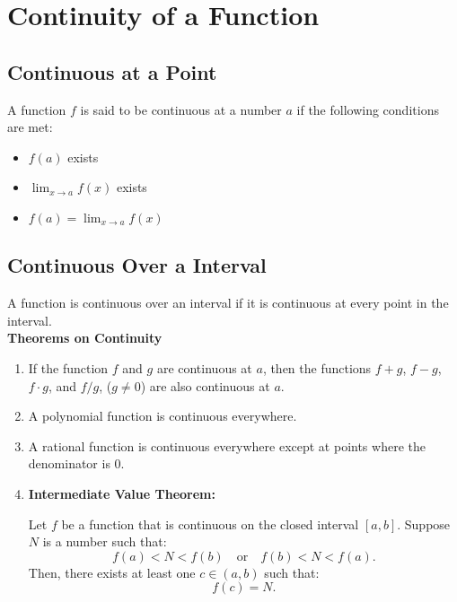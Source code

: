 \documentclass[11pt]{article}
\begin{document}
\section{Continuity of a Function}
\subsection{Continuous at a Point}
A function $f$ is said to be continuous at a number $a$
if the following conditions are met:
\begin{itemize}
    \item $f(a)$ exists
    \item $\displaystyle\lim_{x\to a}f(x)$ exists
    \item $\displaystyle f(a) = \lim_{x\to a}f(x)$
\end{itemize}
\subsection{Continuous Over a Interval}
A function is continuous over an interval if it is continuous at every point in the interval.\\[.5em]
\textbf{Theorems on Continuity}
\begin{enumerate}
    \item If the function $f$ and $g$ are continuous at $a$, 
        then the functions $f+g$, $f-g$, $f\cdot g$, and $f/g$, ($g \neq 0$) are also continuous at $a$.
    \item A polynomial function is continuous everywhere.
    \item A rational function is continuous everywhere except at points where the denominator is $0$.
    \item \textbf{Intermediate Value Theorem:}
        Let $f$ be a function that is continuous on the closed interval $[a, b]$. Suppose $N$ is a number such that:
        \[
            f(a) < N < f(b) \quad \text{or} \quad f(b) < N < f(a).
        \]
        Then, there exists at least one $c \in (a, b)$ such that:
        \[
            f(c) = N.
        \]
\end{enumerate}
\end{document}
